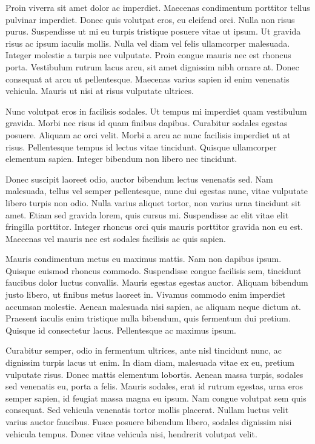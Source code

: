 \documentclass{article}
\begin{document}
Proin viverra sit amet dolor ac imperdiet. Maecenas condimentum porttitor tellus pulvinar imperdiet. Donec quis volutpat eros, eu eleifend orci. Nulla non risus purus. Suspendisse ut mi eu turpis tristique posuere vitae ut ipsum. Ut gravida risus ac ipsum iaculis mollis. Nulla vel diam vel felis ullamcorper malesuada. Integer molestie a turpis nec vulputate. Proin congue mauris nec est rhoncus porta. Vestibulum rutrum lacus arcu, sit amet dignissim nibh ornare at. Donec consequat at arcu ut pellentesque. Maecenas varius sapien id enim venenatis vehicula. Mauris ut nisi at risus vulputate ultrices.

Nunc volutpat eros in facilisis sodales. Ut tempus mi imperdiet quam vestibulum gravida. Morbi nec risus id quam finibus dapibus. Curabitur sodales egestas posuere. Aliquam ac orci velit. Morbi a arcu ac nunc facilisis imperdiet ut at risus. Pellentesque tempus id lectus vitae tincidunt. Quisque ullamcorper elementum sapien. Integer bibendum non libero nec tincidunt.

Donec suscipit laoreet odio, auctor bibendum lectus venenatis sed. Nam malesuada, tellus vel semper pellentesque, nunc dui egestas nunc, vitae vulputate libero turpis non odio. Nulla varius aliquet tortor, non varius urna tincidunt sit amet. Etiam sed gravida lorem, quis cursus mi. Suspendisse ac elit vitae elit fringilla porttitor. Integer rhoncus orci quis mauris porttitor gravida non eu est. Maecenas vel mauris nec est sodales facilisis ac quis sapien.

Mauris condimentum metus eu maximus mattis. Nam non dapibus ipsum. Quisque euismod rhoncus commodo. Suspendisse congue facilisis sem, tincidunt faucibus dolor luctus convallis. Mauris egestas egestas auctor. Aliquam bibendum justo libero, ut finibus metus laoreet in. Vivamus commodo enim imperdiet accumsan molestie. Aenean malesuada nisi sapien, ac aliquam neque dictum at. Praesent iaculis enim tristique nulla bibendum, quis fermentum dui pretium. Quisque id consectetur lacus. Pellentesque ac maximus ipsum.

Curabitur semper, odio in fermentum ultrices, ante nisl tincidunt nunc, ac dignissim turpis lacus ut enim. In diam diam, malesuada vitae ex eu, pretium vulputate risus. Donec mattis elementum lobortis. Aenean massa turpis, sodales sed venenatis eu, porta a felis. Mauris sodales, erat id rutrum egestas, urna eros semper sapien, id feugiat massa magna eu ipsum. Nam congue volutpat sem quis consequat. Sed vehicula venenatis tortor mollis placerat. Nullam luctus velit varius auctor faucibus. Fusce posuere bibendum libero, sodales dignissim nisi vehicula tempus. Donec vitae vehicula nisi, hendrerit volutpat velit.
\end{document}
